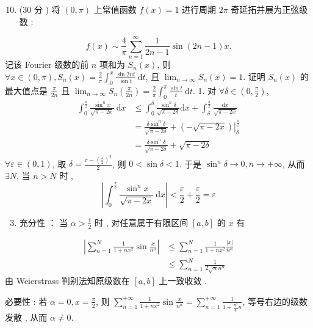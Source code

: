 \documentclass[10pt]{article}
\begin{document}
\begin{enumerate}
  \setcounter{enumi}{9}
  \item (30  分 )  将  $(0, \pi)$  上常值函数  $f(x)=1$  进行周期  $2 \pi$  奇延拓并展为正弦级数 :
\end{enumerate}
$$
f(x) \sim \frac{4}{\pi} \sum_{n=1}^{\infty} \frac{1}{2 n-1} \sin (2 n-1) x .
$$
 记该  Fourier  级数的前  $n$  项和为  $S_{n}(x)$,  则  $\forall x \in(0, \pi), S_{n}(x)=\frac{2}{\pi} \int_{0}^{x} \frac{\sin 2 n t}{\sin t} \mathrm{~d} t$,  且  $\lim _{n \rightarrow \infty} S_{n}(x)=1$.  证明  $S_{n}(x)$  的最大值点是  $\frac{\pi}{2 n}$  且  $\lim _{n \rightarrow \infty} S_{n}\left(\frac{\pi}{2 n}\right)=\frac{2}{\pi} \int_{0}^{\pi} \frac{\sin t}{t} \mathrm{~d} t$. 1.  对  $\forall \delta \in\left(0, \frac{\pi}{2}\right)$,
$$
\begin{aligned}
\int_{0}^{\frac{\pi}{2}} \frac{\sin ^{n} x}{\sqrt{\pi-2 x}} \mathrm{~d} x & \leqslant \int_{0}^{\delta} \frac{\sin ^{n} \delta}{\sqrt{\pi-2 \delta}} \mathrm{d} x+\int_{\delta}^{\frac{\pi}{2}} \frac{\mathrm{d} x}{\sqrt{\pi-2 x}} \\
&=\frac{\delta \sin ^{n} \delta}{\sqrt{\pi-2 \delta}}+\left.(-\sqrt{\pi-2 x})\right|_{\delta} ^{\frac{\pi}{2}} \\
&=\frac{\delta \sin ^{n} \delta}{\sqrt{\pi-2 \delta}}+\sqrt{\pi-2 \delta}
\end{aligned}
$$
$\forall \varepsilon \in(0,1)$,  取  $\delta=\frac{\pi-\left(\frac{\varepsilon}{2}\right)^{2}}{2}$,  则  $0<\sin \delta<1$.  于是  $\sin ^{n} \delta \rightarrow 0, n \rightarrow+\infty$,  从而  $\exists N$,  当  $n>N$  时 ,
$$
\left|\int_{0}^{\frac{\pi}{2}} \frac{\sin ^{n} x}{\sqrt{\pi-2 x}} \mathrm{~d} x\right|<\frac{\varepsilon}{2}+\frac{\varepsilon}{2}=\varepsilon
$$

\begin{enumerate}
  \setcounter{enumi}{2}
  \item  充分性 ： 当  $\alpha>\frac{1}{2}$  时 ,  对任意属于有限区间  $[a, b]$  的  $x$  有 
\end{enumerate}
$$
\begin{aligned}
\left|\sum_{n=1}^{N} \frac{1}{1+n x^{2}} \sin \frac{x}{n^{\alpha}}\right| & \leqslant \sum_{n=1}^{N} \frac{1}{1+n x^{2}} \frac{|x|}{n^{\alpha}} \\
& \leqslant \sum_{n=1}^{N} \frac{1}{2 \sqrt{n} n^{\alpha}}
\end{aligned}
$$
 由  Weierstrass  判别法知原级数在  $[a, b]$  上一致收敛 .

 必要性 :  若  $\alpha=0, x=\frac{\pi}{2}$,  则  $\sum_{n=1}^{+\infty} \frac{1}{1+n x^{2}} \sin \frac{x}{n^{\alpha}}=\sum_{n=1}^{+\infty} \frac{1}{1+\frac{\pi^{2}}{4} n}$,  等号右边的级数发散 ,  从而  $\alpha \neq 0$.
\end{document}
